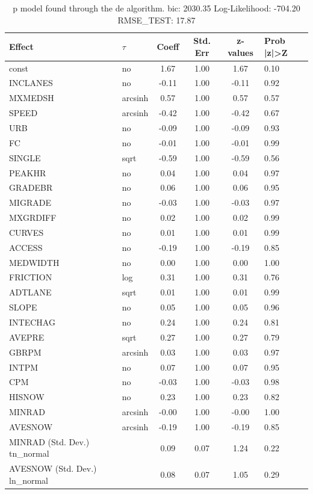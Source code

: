 \begin{table}
	\caption{p model found through the de algorithm. bic: 2030.35 Log-Likelihood: -704.20 RMSE_TEST: 17.87}
	\begin{center}
		\begin{tabular}{|l|l|c|c|c|l|}
			\hline
			Effect & $\tau$ & Coeff & Std. Err & z-values & Prob |z|>Z \\
			\hline
			const & no & 1.67 & 1.00 & 1.67 & 0.10 \\
			\hline
			INCLANES & no & -0.11 & 1.00 & -0.11 & 0.92 \\
			\hline
			MXMEDSH & arcsinh & 0.57 & 1.00 & 0.57 & 0.57 \\
			\hline
			SPEED & arcsinh & -0.42 & 1.00 & -0.42 & 0.67 \\
			\hline
			URB & no & -0.09 & 1.00 & -0.09 & 0.93 \\
			\hline
			FC & no & -0.01 & 1.00 & -0.01 & 0.99 \\
			\hline
			SINGLE & sqrt & -0.59 & 1.00 & -0.59 & 0.56 \\
			\hline
			PEAKHR & no & 0.04 & 1.00 & 0.04 & 0.97 \\
			\hline
			GRADEBR & no & 0.06 & 1.00 & 0.06 & 0.95 \\
			\hline
			MIGRADE & no & -0.03 & 1.00 & -0.03 & 0.97 \\
			\hline
			MXGRDIFF & no & 0.02 & 1.00 & 0.02 & 0.99 \\
			\hline
			CURVES & no & 0.01 & 1.00 & 0.01 & 0.99 \\
			\hline
			ACCESS & no & -0.19 & 1.00 & -0.19 & 0.85 \\
			\hline
			MEDWIDTH & no & 0.00 & 1.00 & 0.00 & 1.00 \\
			\hline
			FRICTION & log & 0.31 & 1.00 & 0.31 & 0.76 \\
			\hline
			ADTLANE & sqrt & 0.01 & 1.00 & 0.01 & 0.99 \\
			\hline
			SLOPE & no & 0.05 & 1.00 & 0.05 & 0.96 \\
			\hline
			INTECHAG & no & 0.24 & 1.00 & 0.24 & 0.81 \\
			\hline
			AVEPRE & sqrt & 0.27 & 1.00 & 0.27 & 0.79 \\
			\hline
			GBRPM & arcsinh & 0.03 & 1.00 & 0.03 & 0.97 \\
			\hline
			INTPM & no & 0.07 & 1.00 & 0.07 & 0.95 \\
			\hline
			CPM & no & -0.03 & 1.00 & -0.03 & 0.98 \\
			\hline
			HISNOW & no & 0.23 & 1.00 & 0.23 & 0.82 \\
			\hline
			MINRAD & arcsinh & -0.00 & 1.00 & -0.00 & 1.00 \\
			\hline
			AVESNOW & arcsinh & -0.19 & 1.00 & -0.19 & 0.85 \\
			\hline
			MINRAD (Std. Dev.) tn_normal &  & 0.09 & 0.07 & 1.24 & 0.22 \\
			\hline
			AVESNOW (Std. Dev.) ln_normal &  & 0.08 & 0.07 & 1.05 & 0.29 \\
			\hline
		\end{tabular}
	\end{center}
\end{table}